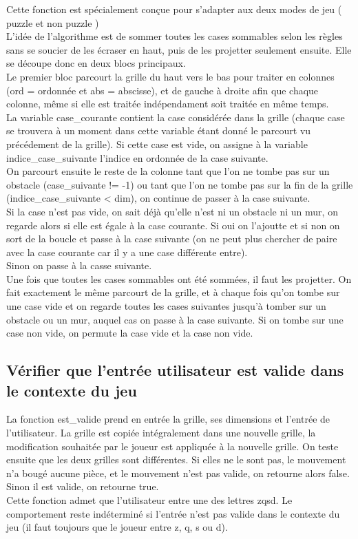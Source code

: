 \documentclass[12pt]{article}
\begin{document}
\indent Cette fonction est spécialement conçue pour s'adapter aux deux modes de jeu ( puzzle et non puzzle )\\
L'idée de l'algorithme est de sommer toutes les cases sommables selon les règles sans se soucier de les écraser en haut, puis de les projetter seulement ensuite. Elle se découpe donc en deux blocs principaux. \\
\indent Le premier bloc parcourt la grille du haut vers le bas pour traiter en colonnes (ord = ordonnée et abs = abscisse), et de gauche à droite afin que chaque colonne, même si elle est traitée indépendament soit traitée en même temps.\\
La variable case\_courante contient la case considérée dans la grille (chaque case se trouvera à un moment dans cette variable étant donné le parcourt vu précédement de la grille). Si cette case est vide, on assigne à la variable indice\_case\_suivante l'indice en ordonnée de la case suivante.\\
On parcourt ensuite le reste de la colonne tant que l'on ne tombe pas sur un obstacle (case\_suivante != -1) ou tant que l'on ne tombe pas sur la fin de la grille (indice\_case\_suivante < dim), on continue de passer à la case suivante.\\
Si la case n'est pas vide, on sait déjà qu'elle n'est ni un obstacle ni un mur, on regarde alors si elle est égale à la case courante. Si oui on l'ajoutte et si non on sort de la boucle et passe à la case suivante (on ne peut plus chercher de paire avec la case courante car il y a une case différente entre).\\
Sinon on passe à la casse suivante.\\
\indent Une fois que toutes les cases sommables ont été sommées, il faut les projetter. On fait exactement le même parcourt de la grille, et à chaque fois qu'on tombe sur une case vide et on regarde toutes les cases suivantes jusqu'à tomber sur un obstacle ou un mur, auquel cas on passe à la case suivante. Si on tombe sur une case non vide, on permute la case vide et la case non vide.

\subsection{Vérifier que l'entrée utilisateur est valide dans le contexte du jeu}

\indent La fonction est\_valide prend en entrée la grille, ses dimensions et l'entrée de l'utilisateur. La grille est copiée intégralement dans une nouvelle grille, la modification souhaitée par le joueur est appliquée à la nouvelle grille. On teste ensuite que les deux grilles sont différentes. Si elles ne le sont pas, le mouvement n'a bougé aucune pièce, et le mouvement n'est pas valide, on retourne alors false. Sinon il est valide, on retourne true.\\
Cette fonction admet que l'utilisateur entre une des lettres zqsd. Le comportement reste indéterminé si l'entrée n'est pas valide dans le contexte du jeu (il faut toujours que le joueur entre z, q, s ou d).
\end{document}
